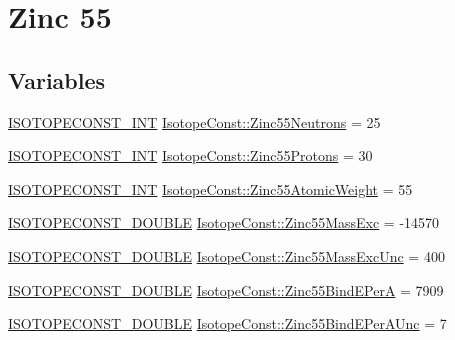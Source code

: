 \hypertarget{group___isotope_const-_zinc-_zn55}{}\section{Zinc 55}
\label{group___isotope_const-_zinc-_zn55}
\subsection*{Variables}
\begin{DoxyCompactItemize}
\item 
\mbox{\hyperlink{group___isotope_const-_macros_ga5f18360b3e99483a35c32d789e62621c}{I\+S\+O\+T\+O\+P\+E\+C\+O\+N\+S\+T\+\_\+\+I\+NT}} \mbox{\hyperlink{group___isotope_const-_zinc-_zn55_ga7852fa4c1947a9ac31b11e5c758bce3f}{Isotope\+Const\+::\+Zinc55\+Neutrons}} = 25
\item 
\mbox{\hyperlink{group___isotope_const-_macros_ga5f18360b3e99483a35c32d789e62621c}{I\+S\+O\+T\+O\+P\+E\+C\+O\+N\+S\+T\+\_\+\+I\+NT}} \mbox{\hyperlink{group___isotope_const-_zinc-_zn55_ga2fa2054c7ecfa0469b2668d7861dbdec}{Isotope\+Const\+::\+Zinc55\+Protons}} = 30
\item 
\mbox{\hyperlink{group___isotope_const-_macros_ga5f18360b3e99483a35c32d789e62621c}{I\+S\+O\+T\+O\+P\+E\+C\+O\+N\+S\+T\+\_\+\+I\+NT}} \mbox{\hyperlink{group___isotope_const-_zinc-_zn55_gac44cccb250540486c1d771deec41b055}{Isotope\+Const\+::\+Zinc55\+Atomic\+Weight}} = 55
\item 
\mbox{\hyperlink{group___isotope_const-_macros_ga8f45a7272ce02c0b4c65c44636ed719a}{I\+S\+O\+T\+O\+P\+E\+C\+O\+N\+S\+T\+\_\+\+D\+O\+U\+B\+LE}} \mbox{\hyperlink{group___isotope_const-_zinc-_zn55_ga99147263677f948588507fb03f07ca59}{Isotope\+Const\+::\+Zinc55\+Mass\+Exc}} = -\/14570
\item 
\mbox{\hyperlink{group___isotope_const-_macros_ga8f45a7272ce02c0b4c65c44636ed719a}{I\+S\+O\+T\+O\+P\+E\+C\+O\+N\+S\+T\+\_\+\+D\+O\+U\+B\+LE}} \mbox{\hyperlink{group___isotope_const-_zinc-_zn55_ga291ce991f1af11af6a2f5309ab93607d}{Isotope\+Const\+::\+Zinc55\+Mass\+Exc\+Unc}} = 400
\item 
\mbox{\hyperlink{group___isotope_const-_macros_ga8f45a7272ce02c0b4c65c44636ed719a}{I\+S\+O\+T\+O\+P\+E\+C\+O\+N\+S\+T\+\_\+\+D\+O\+U\+B\+LE}} \mbox{\hyperlink{group___isotope_const-_zinc-_zn55_ga52248dc49ea262ceb856bdd53f344221}{Isotope\+Const\+::\+Zinc55\+Bind\+E\+PerA}} = 7909
\item 
\mbox{\hyperlink{group___isotope_const-_macros_ga8f45a7272ce02c0b4c65c44636ed719a}{I\+S\+O\+T\+O\+P\+E\+C\+O\+N\+S\+T\+\_\+\+D\+O\+U\+B\+LE}} \mbox{\hyperlink{group___isotope_const-_zinc-_zn55_ga0a2c3681bee7c9de7057269a1f13b4ba}{Isotope\+Const\+::\+Zinc55\+Bind\+E\+Per\+A\+Unc}} = 7

\end{DoxyCompactItemize}
